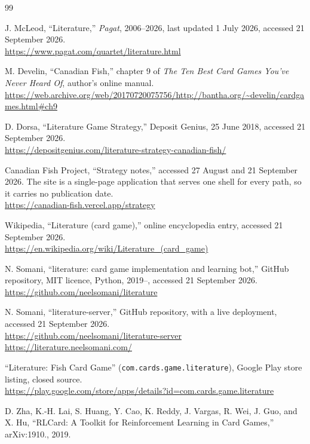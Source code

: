 \begin{thebibliography}{99}
\setlength{\itemsep}{0pt}\setlength{\parsep}{0pt}

J. McLeod, ``Literature,'' \emph{Pagat}, 2006--2026, last updated 1 July 2026, accessed
21 September 2026.\\
\url{https://www.pagat.com/quartet/literature.html}

M. Develin, ``Canadian Fish,'' chapter 9 of \emph{The Ten Best Card Games You've
Never Heard Of}, author's online manual.\\
\url{https://web.archive.org/web/20170720075756/http://bantha.org/~develin/cardgames.html\#ch9}

D. Dorsa, ``Literature Game Strategy,'' Deposit Genius, 25 June 2018, accessed 21 September
2026.\\
\url{https://depositgenius.com/literature-strategy-canadian-fish/}

Canadian Fish Project, ``Strategy notes,'' accessed 27 August and 21 September 2026. The site
is a single-page application that serves one shell for every path, so it carries no publication
date.\\
\url{https://canadian-fish.vercel.app/strategy}

Wikipedia, ``Literature (card game),'' online encyclopedia entry, accessed 21 September 2026.\\
\url{https://en.wikipedia.org/wiki/Literature_(card_game)}

N. Somani, ``literature: card game implementation and learning bot,'' GitHub
repository, MIT licence, Python, 2019--, accessed 21 September 2026.\\
\url{https://github.com/neelsomani/literature}

N. Somani, ``literature-server,'' GitHub repository, with a live deployment, accessed
21 September 2026.\\
\url{https://github.com/neelsomani/literature-server}\\
\url{https://literature.neelsomani.com/}

``Literature: Fish Card Game'' (\texttt{com.cards.game.literature}), Google Play
store listing, closed source.\\
\url{https://play.google.com/store/apps/details?id=com.cards.game.literature}

D. Zha, K.-H. Lai, S. Huang, Y. Cao, K. Reddy, J. Vargas, R. Wei, J. Guo, and
X. Hu, ``RLCard: A Toolkit for Reinforcement Learning in Card Games,''
arXiv:1910., 2019.


\end{thebibliography}
